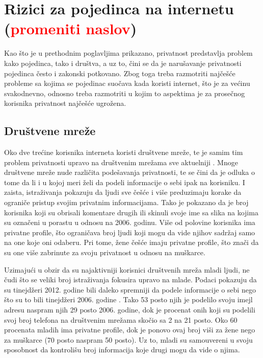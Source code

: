 \documentclass[a4paper]{article}
\newcommand\todos[1]{\textcolor{red}{#1}}
\begin{document}
\section{Rizici za pojedinca na internetu (\todos{promeniti naslov})}
\label{sec:trecePoglavlje}
Kao što je u prethodnim poglavljima prikazano, privatnost predstavlja problem kako pojedinca, tako i društva, a uz to, čini se da je narušavanje privatnosti pojedinca često i zakonski potkovano. Zbog toga treba razmotriti najčešće probleme sa kojima se pojedinac suočava kada koristi internet, što je za većinu svakodnevno, odnosno treba razmotriti u kojim to aspektima je za prosečnog korisnika privatnost najčešće ugrožena.

\subsection{Društvene mreže}
Oko dve trećine korisnika interneta koristi društvene mreže, te je samim tim problem privatnosti upravo na društvenim mrežama sve aktuelniji \cite{sm1}. Mnoge društvene mreže nude različita podešavanja privatnosti, te se čini da je odluka o tome da li i u kojoj meri želi da podeli informacije o sebi ipak na korisniku. I zaista, istraživanja pokazuju da ljudi sve češće i više preduzimaju korake da ograniče pristup svojim privatnim informacijama. Tako je pokazano da je broj korisnika koji su obrisali komentare drugih ili skinuli svoje ime sa slika na kojima su označeni u porastu u odnosu na 2006. godinu. Više od polovine korisnika ima privatne profile, što ograničava broj ljudi koji mogu da vide njihov sadržaj samo na one koje oni odaberu. Pri tome, žene češće imaju privatne profile, što znači da su one više zabrinute za svoju privatnost u odnosu na muškarce.
\par Uzimajući u obzir da su najaktivniji korisnici društvenih mreža mladi ljudi, ne čudi što se veliki broj istraživanja fokusira upravo na mlade. Podaci pokazuju da su tinejdžeri 2012. godine bili daleko spremniji da podele informacije o sebi nego što su to bili tinejdžeri 2006. godine \cite{sm2}. Tako 53 posto njih je podelilo svoju imejl adresu naspram njih 29 posto 2006. godine, dok je procenat onih koji su podelili svoj broj telefona na društvenim mrežama skočio sa 2 na 21 posto. Oko 60 procenata mladih ima privatne profile, dok je ponovo ovaj broj viši za žene nego za muškarce (70 posto naspram 50 posto). Uz to, mladi su samouvereni u svoju sposobnost da kontrolišu broj informacija koje drugi mogu da vide o njima.
\end{document}
